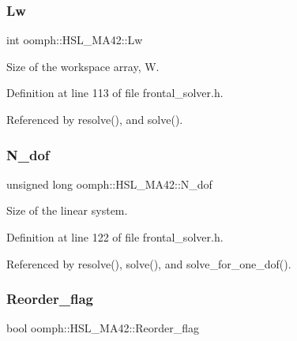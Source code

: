 \subsubsection{\texorpdfstring{Lw}{Lw}}
{\footnotesize\ttfamily int oomph\+::\+H\+S\+L\+\_\+\+M\+A42\+::\+Lw\hspace{0.3cm}{\ttfamily [private]}}



Size of the workspace array, W. 



Definition at line 113 of file frontal\+\_\+solver.\+h.



Referenced by resolve(), and solve().

\mbox{\label{classoomph_1_1HSL__MA42_aff8698e483ecef88d1a326ebe300a7ce}} 
\subsubsection{\texorpdfstring{N\+\_\+dof}{N\_dof}}
{\footnotesize\ttfamily unsigned long oomph\+::\+H\+S\+L\+\_\+\+M\+A42\+::\+N\+\_\+dof\hspace{0.3cm}{\ttfamily [private]}}



Size of the linear system. 



Definition at line 122 of file frontal\+\_\+solver.\+h.



Referenced by resolve(), solve(), and solve\+\_\+for\+\_\+one\+\_\+dof().

\mbox{\label{classoomph_1_1HSL__MA42_a3ed31f1e33f586e5fe9dc87f116e588f}} 
\subsubsection{\texorpdfstring{Reorder\+\_\+flag}{Reorder\_flag}}
{\footnotesize\ttfamily bool oomph\+::\+H\+S\+L\+\_\+\+M\+A42\+::\+Reorder\+\_\+flag\hspace{0.3cm}{\ttfamily [private]}}



